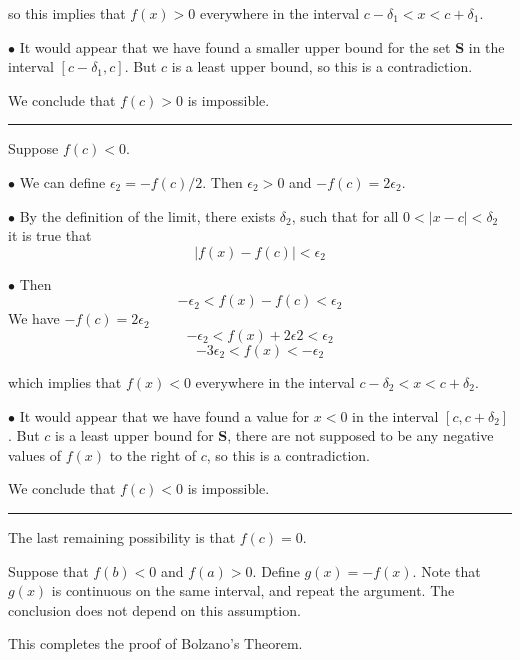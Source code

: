 \documentclass[11pt, oneside]{article}
\begin{document}
so this implies that $f(x) > 0$ everywhere in the interval $c - \delta_1 < x < c + \delta_1$.

$\bullet$  It would appear that we have found a smaller upper bound for the set $\mathbf{S}$ in the interval $[c - \delta_1,c]$.  But $c$ is a least upper bound, so this is a contradiction.

We conclude that $f(c) > 0$ is impossible.

\noindent\rule{2cm}{0.4pt}

Suppose $f(c) < 0$.

$\bullet$  We can define $\epsilon_2 = -f(c)/2$.  Then $\epsilon_2 > 0$ and $-f(c) = 2 \epsilon_2$.

$\bullet$  By the definition of the limit, there exists $\delta_2$, such that for all $0 < |x - c| < \delta_2$ it is true that
\[ |f(x) - f(c)| < \epsilon_2 \]

$\bullet$  Then
\[ -\epsilon_2 < f(x) - f(c) < \epsilon_2 \]
We have $-f(c) = 2 \epsilon_2$
\[ -\epsilon_2 < f(x) + 2 \epsilon2 < \epsilon_2 \]
\[ -3\epsilon_2 < f(x) < -\epsilon_2 \]

which implies that $f(x) < 0$ everywhere in the interval $c - \delta_2 < x < c + \delta_2$.

$\bullet$  It would appear that we have found a value for $x < 0$ in the interval $[c, c + \delta_2]$.  But $c$ is a least upper bound for $\mathbf{S}$, there are not supposed to be any negative values of $f(x)$ to the right of $c$, so this is a contradiction.  

We conclude that $f(c) < 0$ is impossible.

\noindent\rule{2cm}{0.4pt}

The last remaining possibility is that $f(c) = 0$.

Suppose that $f(b) < 0$ and $f(a) > 0$.  Define $g(x) = -f(x)$.  Note that $g(x)$ is continuous on the same interval, and repeat the argument.  The conclusion does not depend on this assumption.

This completes the proof of Bolzano's Theorem.
\end{document}
